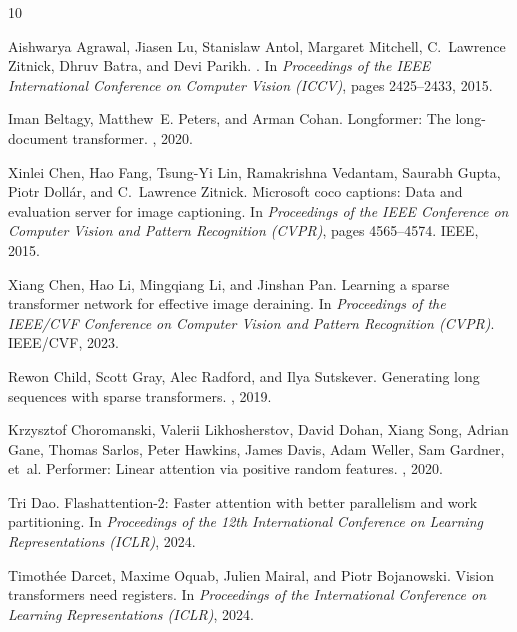 \documentclass[10pt,twocolumn,letterpaper]{article}
\begin{document}
 
{\small

\begin{thebibliography}{10}\itemsep=-1pt

Aishwarya Agrawal, Jiasen Lu, Stanislaw Antol, Margaret Mitchell, C.~Lawrence Zitnick, Dhruv Batra, and Devi Parikh.
.
\newblock In {\em Proceedings of the IEEE International Conference on Computer Vision (ICCV)}, pages 2425--2433, 2015.

Iman Beltagy, Matthew~E. Peters, and Arman Cohan.
\newblock Longformer: The long-document transformer.
, 2020.

Xinlei Chen, Hao Fang, Tsung-Yi Lin, Ramakrishna Vedantam, Saurabh Gupta, Piotr Doll{\'a}r, and C.~Lawrence Zitnick.
\newblock Microsoft coco captions: Data and evaluation server for image captioning.
\newblock In {\em Proceedings of the IEEE Conference on Computer Vision and Pattern Recognition (CVPR)}, pages 4565--4574. IEEE, 2015.

Xiang Chen, Hao Li, Mingqiang Li, and Jinshan Pan.
\newblock Learning a sparse transformer network for effective image deraining.
\newblock In {\em Proceedings of the IEEE/CVF Conference on Computer Vision and Pattern Recognition (CVPR)}. IEEE/CVF, 2023.

Rewon Child, Scott Gray, Alec Radford, and Ilya Sutskever.
\newblock Generating long sequences with sparse transformers.
, 2019.

Krzysztof Choromanski, Valerii Likhosherstov, David Dohan, Xiang Song, Adrian Gane, Thomas Sarlos, Peter Hawkins, James Davis, Adam Weller, Sam Gardner, et~al.
\newblock Performer: Linear attention via positive random features.
, 2020.

Tri Dao.
\newblock Flashattention-2: Faster attention with better parallelism and work partitioning.
\newblock In {\em Proceedings of the 12th International Conference on Learning Representations (ICLR)}, 2024.

Timothée Darcet, Maxime Oquab, Julien Mairal, and Piotr Bojanowski.
\newblock Vision transformers need registers.
\newblock In {\em Proceedings of the International Conference on Learning Representations (ICLR)}, 2024.


\end{thebibliography}}
\end{document}
